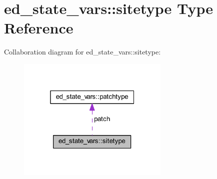 \hypertarget{structed__state__vars_1_1sitetype}{}\section{ed\+\_\+state\+\_\+vars\+:\+:sitetype Type Reference}
\label{structed__state__vars_1_1sitetype}


Collaboration diagram for ed\+\_\+state\+\_\+vars\+:\+:sitetype\+:\nopagebreak
\begin{figure}[H]
\begin{center}
\leavevmode
\includegraphics[width=205pt]{structed__state__vars_1_1sitetype__coll__graph}
\end{center}
\end{figure}

